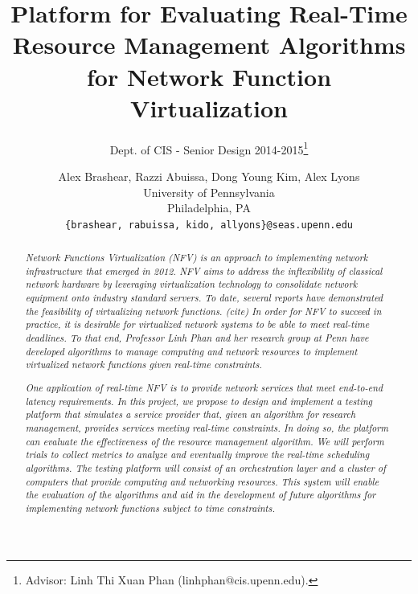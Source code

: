 \documentclass{sig-alternate}
\begin{document}
\title{Platform for Evaluating Real-Time Resource Management Algorithms for Network Function Virtualization}
\subtitle{Dept. of CIS - Senior Design 2014-2015\thanks{Advisor: Linh Thi Xuan Phan (linhphan@cis.upenn.edu).}}
\author{
\alignauthor Alex Brashear, Razzi Abuissa, Dong Young Kim, Alex Lyons\\
\vspace{.4cm}
University of Pennsylvania\\
Philadelphia, PA \\
\vspace{.4cm}
\texttt{\{brashear, rabuissa, kido, allyons\}@seas.upenn.edu}
}

\date{}
\maketitle

\begin{abstract}
  \textit{Network Functions Virtualization (NFV) is an approach to implementing network infrastructure that emerged in 2012. NFV aims to address the inflexibility of classical network hardware by leveraging virtualization technology to consolidate network equipment onto industry standard servers. To date, several reports have demonstrated the feasibility of virtualizing network functions. (cite) In order for NFV to succeed in practice, it is desirable for virtualized network systems to be able to meet real-time deadlines. To that end, Professor Linh Phan and her research group at Penn have developed algorithms to manage computing and network resources to implement virtualized network functions given real-time constraints.}

  \textit{One application of real-time NFV is to provide network services that meet end-to-end latency requirements. In this project, we propose to design and implement a testing platform that simulates a service provider that, given an algorithm for research management, provides services meeting real-time constraints. In doing so, the platform can evaluate the effectiveness of the resource management algorithm. We will perform trials to collect metrics to analyze and eventually improve the real-time scheduling algorithms. The testing platform will consist of an orchestration layer and a cluster of computers that provide computing and networking resources. This system will enable the evaluation of the algorithms and aid in the development of future algorithms for implementing network functions subject to time constraints.}
\end{abstract}
\end{document}
